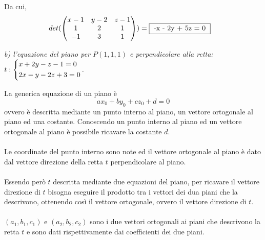 \documentclass[a4paper]{article}
\begin{document}
        Da cui,
        \[
                \begin{aligned}
                        det(
                                \begin{pmatrix}
                                        x - 1 & y - 2 & z - 1 \\
                                        1     & 2     & 1 \\
                                        -1    & 3     & 1 \\
                                \end{pmatrix}
                        ) & = \framebox{ -x - 2y + 5z = 0 }
                \end{aligned}
        \]

        \noindent
        \textsl{
                b) l'equazione del piano per $P(1,1,1)$ e perpendicolare alla retta:
                $
                        t: \begin{dcases}
                                x + 2y - z - 1 = 0 \\
                                2x - y - 2z + 3  = 0
                        \end{dcases}
                $.
        }

        La generica equazione di un piano \`{e}
        \[
                ax_0 + by_0 + cz_0 + d = 0
        \]
        ovvero \`{e} descritta mediante un punto interno al piano, un vettore ortogonale al piano ed una costante. Conoscendo un punto interno al piano ed un vettore ortogonale al piano \`{e} possibile ricavare la costante $d$.

        \paragraph{}
        Le coordinate del punto interno sono note ed il vettore ortogonale al piano \`{e} dato dal vettore direzione della retta $t$ perpendicolare al piano.

        \paragraph{}
        Essendo per\`{o} $t$ descritta mediante due equazioni del piano, per ricavare il vettore direzione di $t$ bisogna eseguire il prodotto tra i vettori dei dua piani che la descrivono, ottenendo cos\`{i} il vettore ortogonale, ovvero il vettore direzione di $t$.

        \paragraph{}
        $(a_1, b_1, c_1)$ e $(a_2, b_2, c_2)$ sono i due vettori ortogonali ai piani che descrivono la retta $t$ e sono dati rispettivamente dai coefficienti dei due piani.
\end{document}

